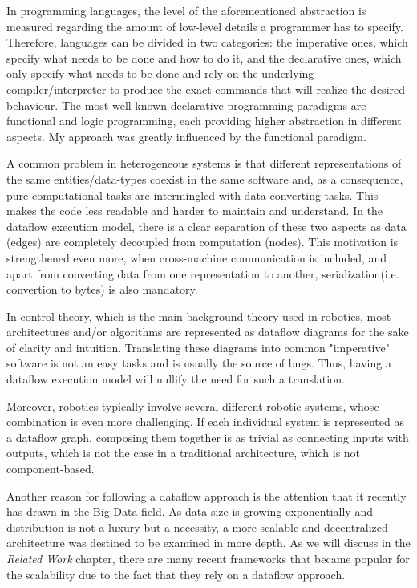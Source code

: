 \documentclass{dithesis}
\begin{document}
In programming languages, the level of the aforementioned abstraction is measured regarding the amount of low-level details a programmer has to specify. Therefore, languages can be divided in two categories: the imperative ones, which specify what needs to be done and how to do it, and the declarative ones, which only specify what needs to be done and rely on the underlying compiler/interpreter to produce the exact commands that will realize the desired behaviour. The most well-known declarative programming paradigms are functional and logic programming, each providing higher abstraction in different aspects. My approach was greatly influenced by the functional paradigm.


A common problem in heterogeneous systems is that different representations of the same entities/data-types coexist in the same software and, as a consequence, pure computational tasks are intermingled with data-converting tasks. This makes the code less readable and harder to maintain and understand. In the dataflow execution model, there is a clear separation of these two aspects as data (edges) are completely decoupled from computation (nodes). This motivation is strengthened even more, when cross-machine communication is included, and apart from converting data from one representation to another, serialization(i.e. convertion to bytes) is also mandatory.


In control theory, which is the main background theory used in robotics, most architectures and/or algorithms are represented as dataflow diagrams for the sake of clarity and intuition. Translating these diagrams into common "imperative" software is not an easy tasks and is usually the source of bugs. Thus, having a dataflow execution model will nullify the need for such a translation.

Moreover, robotics typically involve several different robotic systems, whose combination is even more challenging. If each individual system is represented as a dataflow graph, composing them together is as trivial as connecting inputs with outputs, which is not the case in a traditional architecture, which is not component-based.


Another reason for following a dataflow approach is the attention that it recently has drawn in the Big Data field. As data size is growing exponentially and distribution is not a luxury but a necessity, a more scalable and decentralized architecture was destined to be examined in more depth. As we will discuss in the \textit{Related Work} chapter, there are many recent frameworks that became popular for the scalability due to the fact that they rely on a dataflow approach.
\end{document}

